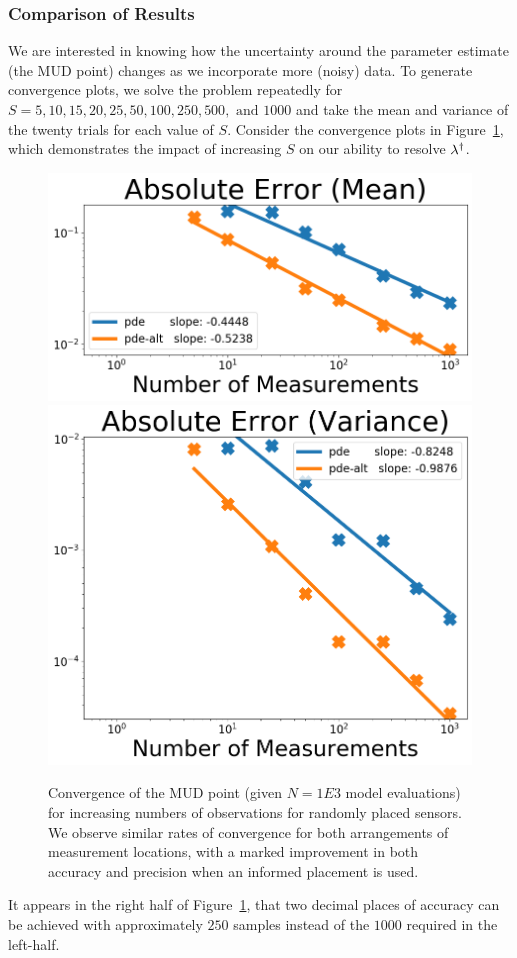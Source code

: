 \FloatBarrier
\subsubsection{Comparison of Results}

We are interested in knowing how the uncertainty around the parameter estimate (the MUD point) changes as we incorporate more (noisy) data.
To generate convergence plots, we solve the problem repeatedly for $S = 5, 10, 15, 20, 25, 50, 100, 250, 500, \text{ and } 1000$ and take the mean and variance of the twenty trials for each value of $S$.
Consider the convergence plots in Figure~\ref{fig:pde-convergence-obs}, which demonstrates the impact of increasing $S$ on our ability to resolve $\lambda^\dagger$.

\begin{figure}
  \centering
  \includegraphics[width=0.475\linewidth]{figures/pde/pde_convergence_mud_obs_mean}
  \includegraphics[width=0.475\linewidth]{figures/pde/pde_convergence_mud_obs_var}
  \caption{Convergence of the MUD point (given $N=1E3$ model evaluations) for increasing numbers of observations for randomly placed sensors.
  We observe similar rates of convergence for both arrangements of measurement locations, with a marked improvement in both accuracy and precision when an informed placement is used.
  }
  \label{fig:pde-convergence-obs}
\end{figure}

It appears in the right half of Figure~\ref{fig:pde-convergence-obs}, that two decimal places of accuracy can be achieved with approximately $250$ samples instead of the $1000$ required in the left-half.


